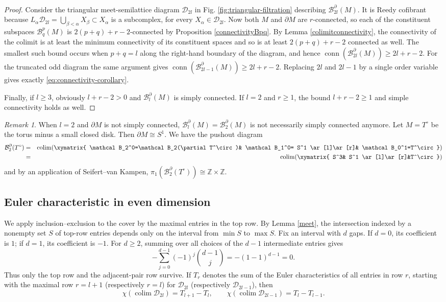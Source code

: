 \documentclass[11pt,a4paper]{article}
\numberwithin{equation}{section}
\theoremstyle{definition}
\theoremstyle{remark}
\newtheorem{rem}[thm]{Remark}
\newcommand{\Z}{\mathbb{Z}}
\newcommand{\pa}{\partial}
\newcommand{\colim}{\operatorname*{colim}}
\newcommand{\BB}{\mathcal B}
\newcommand{\conn}{\operatorname{conn}}
\begin{document}
\begin{proof}
Consider the triangular meet-semilattice diagram $\mathcal D_{2l}$ in Fig. \ref{fig:triangular-filtration} describing $\BB_{2l}^\pa (M)$.
It is Reedy cofibrant because
$L_\alpha\mathcal D_{2l} = \bigcup_{\beta < \alpha} X_\beta\subset X_\alpha$ is a subcomplex, for every $X_\alpha\in\mathcal D_{2l}$.
Now both \(M\) and \(\pa M\) are \(r\)-connected,
so each of the constituent subspaces $\BB_q^p(M)$ is $2(p+q)+r-2$-connected by Proposition \ref{connectivityBpq}.
By Lemma \ref{colimitconnectivity}, the connectivity of the colimit is at least the minimum connectivity of its constituent spaces
and so is at least $2(p+q)+r-2$ connected as well. 
The smallest such bound occurs when $p+q=l$ along the right-hand boundary of the diagram, and hence
\(\conn (\BB_{2l}^\pa (M))\geq 2l+r-2\). For the truncated odd diagram the same argument gives
\(\conn (\BB_{2l-1}^\pa (M))\ge 2l+r-2\). Replacing \(2l\) and \(2l-1\) by a single order variable gives exactly \eqref{eq:connectivity-corollary}.

Finally, if $l\ge 3$, obviously $l+r-2>0$ and $\BB_l^\pa (M)$ is simply connected. If $l=2$ and $r\geq 1$, the bound $l+r-2\geq 1$ and simple connectivity holds as well.
\end{proof}

\begin{rem}\rm 
    When $l=2$ and $\partial M$ is not simply connected, $\BB_l^\pa (M)=\BB_2^\pa (M)$ is not necessarily simply connected anymore. Let $M=T^\circ $ be the torus minus a small closed disk. Then $\pa M\cong S^1$. We have the pushout diagram
    \begin{eqnarray*}\BB_2^\pa (T^\circ) &=&\colim (\xymatrix{
\BB_2^0=\BB_2(\pa T^\circ )&
\BB_1^0= S^1 \ar[l]\ar[r]&
\BB_0^1=T^\circ})\\
&=&\colim (\xymatrix{
S^3& S^1 \ar[l]\ar[r]&T^\circ
})
\end{eqnarray*}
    and by an application of Seifert--van Kampen, $\pi_1(\BB_2^\pa (T^\circ))\cong\Z\times\Z$.
\end{rem}

\subsection{Euler characteristic in even dimension}
\label{sec:euler}

We apply inclusion--exclusion to the cover by the maximal entries in the top
row. By Lemma \ref{meet}, the intersection indexed by a nonempty set \(S\) of
top-row entries depends only on the interval from \(\min S\) to \(\max S\).
Fix an interval with \(d\) gaps. If \(d=0\), its coefficient is \(1\); if
\(d=1\), its coefficient is \(-1\). For \(d\ge2\), summing over all choices of
the \(d-1\) intermediate entries gives
\[
-\sum_{j=0}^{d-1}(-1)^j\binom{d-1}{j}=-(1-1)^{d-1}=0.
\]
Thus only the top row and the adjacent-pair row survive. If \(T_r\) denotes
the sum of the Euler characteristics of all entries in row \(r\), starting
with the maximal row \(r=l+1\) (respectively \(r=l\)) for \(\mathcal D_{2l}\)
(respectively \(\mathcal D_{2l-1}\)), then
\[
\chi (\colim \mathcal D_{2l}) = T_{l+1}-T_l,
\qquad
\chi (\colim \mathcal D_{2l-1}) = T_l-T_{l-1}.
\]
\end{document}
